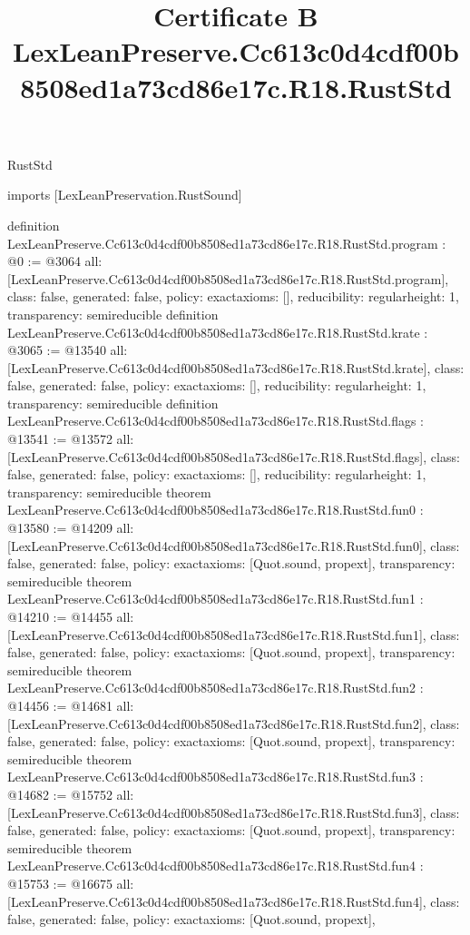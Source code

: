 \begin{lexlean}{RustStd}
\title{Certificate B LexLeanPreserve.Cc613c0d4cdf00b8508ed1a73cd86e17c.R18.RustStd}
\begin{coremodule}
imports [LexLeanPreservation.RustSound]

definition LexLeanPreserve.Cc613c0d4cdf00b8508ed1a73cd86e17c.R18.RustStd.program : @0 := @3064 {
  all: [LexLeanPreserve.Cc613c0d4cdf00b8508ed1a73cd86e17c.R18.RustStd.program],
  class: false,
  generated: false,
  policy: exact{axioms: []},
  reducibility: regular{height: 1},
  transparency: semireducible
}
definition LexLeanPreserve.Cc613c0d4cdf00b8508ed1a73cd86e17c.R18.RustStd.krate : @3065 := @13540 {
  all: [LexLeanPreserve.Cc613c0d4cdf00b8508ed1a73cd86e17c.R18.RustStd.krate],
  class: false,
  generated: false,
  policy: exact{axioms: []},
  reducibility: regular{height: 1},
  transparency: semireducible
}
definition LexLeanPreserve.Cc613c0d4cdf00b8508ed1a73cd86e17c.R18.RustStd.flags : @13541 := @13572 {
  all: [LexLeanPreserve.Cc613c0d4cdf00b8508ed1a73cd86e17c.R18.RustStd.flags],
  class: false,
  generated: false,
  policy: exact{axioms: []},
  reducibility: regular{height: 1},
  transparency: semireducible
}
theorem LexLeanPreserve.Cc613c0d4cdf00b8508ed1a73cd86e17c.R18.RustStd.fun0 : @13580 := @14209 {
  all: [LexLeanPreserve.Cc613c0d4cdf00b8508ed1a73cd86e17c.R18.RustStd.fun0],
  class: false,
  generated: false,
  policy: exact{axioms: [Quot.sound, propext]},
  transparency: semireducible
}
theorem LexLeanPreserve.Cc613c0d4cdf00b8508ed1a73cd86e17c.R18.RustStd.fun1 : @14210 := @14455 {
  all: [LexLeanPreserve.Cc613c0d4cdf00b8508ed1a73cd86e17c.R18.RustStd.fun1],
  class: false,
  generated: false,
  policy: exact{axioms: [Quot.sound, propext]},
  transparency: semireducible
}
theorem LexLeanPreserve.Cc613c0d4cdf00b8508ed1a73cd86e17c.R18.RustStd.fun2 : @14456 := @14681 {
  all: [LexLeanPreserve.Cc613c0d4cdf00b8508ed1a73cd86e17c.R18.RustStd.fun2],
  class: false,
  generated: false,
  policy: exact{axioms: [Quot.sound, propext]},
  transparency: semireducible
}
theorem LexLeanPreserve.Cc613c0d4cdf00b8508ed1a73cd86e17c.R18.RustStd.fun3 : @14682 := @15752 {
  all: [LexLeanPreserve.Cc613c0d4cdf00b8508ed1a73cd86e17c.R18.RustStd.fun3],
  class: false,
  generated: false,
  policy: exact{axioms: [Quot.sound, propext]},
  transparency: semireducible
}
theorem LexLeanPreserve.Cc613c0d4cdf00b8508ed1a73cd86e17c.R18.RustStd.fun4 : @15753 := @16675 {
  all: [LexLeanPreserve.Cc613c0d4cdf00b8508ed1a73cd86e17c.R18.RustStd.fun4],
  class: false,
  generated: false,
  policy: exact{axioms: [Quot.sound, propext]},
}
\end{coremodule}
\end{lexlean}
